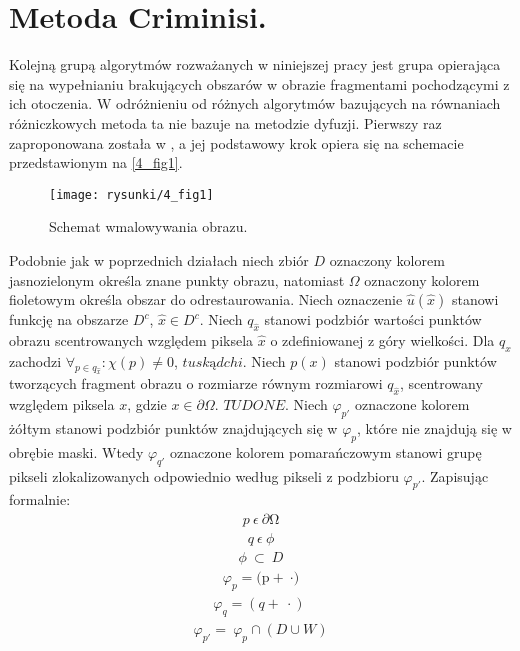 \documentclass[12pt, twoside, openany]{report}
\theoremstyle{definition}
\begin{document}
\section{Metoda Criminisi.}
Kolejną grupą algorytmów rozważanych w niniejszej pracy jest grupa opierająca się na wypełnianiu brakujących obszarów w obrazie fragmentami pochodzącymi z ich otoczenia. W odróżnieniu od różnych algorytmów bazujących na równaniach różniczkowych metoda ta nie bazuje na metodzie dyfuzji. Pierwszy raz zaproponowana została w \cite{efros1999texture}, a jej podstawowy krok opiera się na schemacie przedstawionym na \autoref{4_fig1}.
\begin{figure}[!h]
	\centering
	\texttt{[image: rysunki/4\_fig1]}
	\caption{Schemat wmalowywania obrazu.}
	\label{4_fig1}
\end{figure}
Podobnie jak w poprzednich działach niech zbiór $D$ oznaczony kolorem jasnozielonym określa znane punkty obrazu, natomiast $\Omega$ oznaczony kolorem fioletowym określa obszar do odrestaurowania.
Niech oznaczenie $\hat{u}(\hat{x})$ stanowi funkcję na obszarze $D^c$, $\hat{x}  \in D^c$.
Niech $q_{\hat{x}}$ stanowi podzbiór wartości punktów obrazu scentrowanych względem piksela $\hat{x}$ o zdefiniowanej z góry wielkości.
Dla $q_{\hat{x}}$ zachodzi $\forall_{p \in q_{\hat{x}}} : \chi(p) \neq 0$, $tu skąd chi$.
Niech $p(x)$ stanowi podzbiór punktów tworzących fragment obrazu o rozmiarze równym rozmiarowi $q_{\hat{x}}$, scentrowany względem piksela $x$, gdzie $x \in \partial \Omega$. $TU DONE$.
Niech ${\varphi}_{p'}$ oznaczone kolorem żółtym stanowi podzbiór punktów znajdujących się w ${\varphi}_p$, które nie znajdują się w obrębie maski. Wtedy ${\varphi}_{q'}$ oznaczone kolorem pomarańczowym stanowi grupę pikseli zlokalizowanych odpowiednio według pikseli z podzbioru ${\varphi}_{p'}$. Zapisując formalnie:
\begin{align}
p\ \epsilon \ \partial \mathrm{\Omega }
\end{align}
\begin{align}
q\ \epsilon \mathrm{\ }\phi
\label{qSource}
\end{align}
\begin{align}
\phi \ \subset \ D
\end{align}
\begin{align}
{\varphi }_p=\mathrm{(p+\ }\mathrm{\cdot }\mathrm{)}
\end{align}
\begin{align}
{\varphi }_q=(q+\ \cdot )\ 
\end{align}
\begin{align}
{\varphi }_{p'}=\ {\varphi }_p\cap (D\cup W) 
\end{align}
\end{document}
